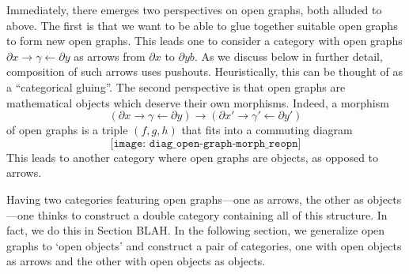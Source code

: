 Immediately, there emerges two perspectives on open graphs, both alluded to above. The first is that we want to be able to glue together suitable open graphs to form new open graphs. This leads one to consider a category with open graphs $ \partial x \to \gamma \gets \partial y $ as arrows from $ \partial x $ to $ \partial y b $.  As we discuss below in further detail, composition of such arrows uses pushouts. Heuristically, this can be thought of as a ``categorical gluing''.  The second perspective is that open graphs are mathematical objects which deserve their own morphisms.  Indeed, a morphism 
\[
(\partial x \to \gamma \gets \partial y) \to ( \partial x' \to \gamma' \gets \partial y' )
\]
of open graphs is a triple $ (f,g,h) $ that fits into a commuting diagram
\[
\texttt{[image: diag\_open-graph-morph\_reopn]}
\]
This leads to another category where open graphs are objects, as opposed to arrows.  

Having two categories featuring open graphs---one as arrows, the other as objects---one thinks to construct a double category containing all of this structure.  In fact, we do this in Section BLAH. 
In the following section, we generalize open graphs to `open objects' and construct a pair of categories, one with open objects as arrows and the other with open objects as objects.  




